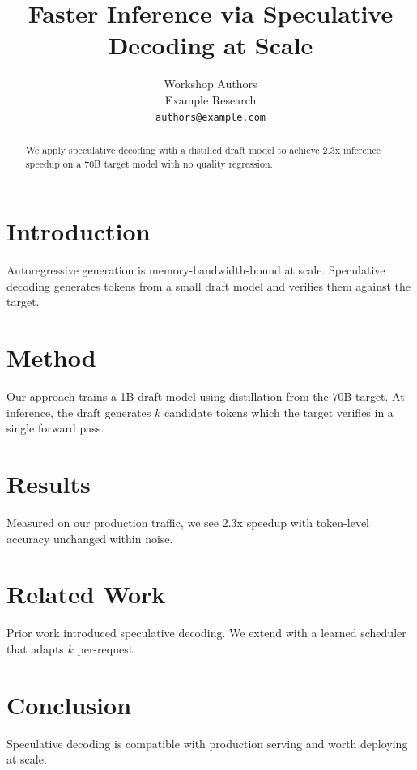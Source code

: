 \documentclass{article}
\title{Faster Inference via Speculative Decoding at Scale}
\author{%
  Workshop Authors \\
  Example Research \\
  \texttt{authors@example.com}
}
\begin{document}
\maketitle

\begin{abstract}
We apply speculative decoding with a distilled draft model to achieve 2.3x inference speedup on a 70B target model with no quality regression.
\end{abstract}

\section{Introduction}
Autoregressive generation is memory-bandwidth-bound at scale. Speculative decoding generates tokens from a small draft model and verifies them against the target.

\section{Method}
Our approach trains a 1B draft model using distillation from the 70B target. At inference, the draft generates $k$ candidate tokens which the target verifies in a single forward pass.

\section{Results}
Measured on our production traffic, we see 2.3x speedup with token-level accuracy unchanged within noise.

\section{Related Work}
Prior work \cite{specdecode2023} introduced speculative decoding. We extend with a learned scheduler that adapts $k$ per-request.

\section{Conclusion}
Speculative decoding is compatible with production serving and worth deploying at scale.
\end{document}
